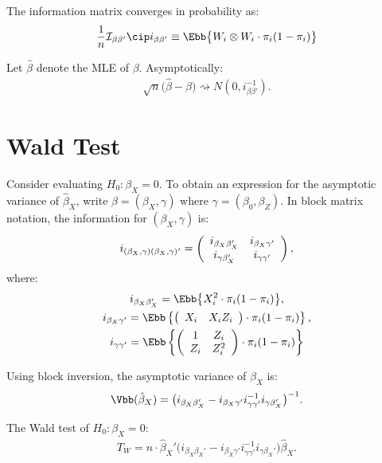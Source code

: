 The information matrix converges in probability as:
\begin{align*}
\frac{1}{n} \mathcal{I}_{\beta\beta'} \cip i_{\beta\beta'} \equiv \Ebb\big\{W_{i} \otimes W_{i} \cdot \pi_{i}(1 - \pi_{i})\big\}
\end{align*}

Let $\hat{\beta}$ denote the MLE of $\beta$. Asymptotically:
\begin{align*}
\sqrt{n}\big(\hat{\beta} - \beta \big) \rightsquigarrow N(0, i_{\beta\beta'}^{-1}). 
\end{align*}

\section{Wald Test}

Consider evaluating $H_{0}: \beta_{X} = 0$. To obtain an expression for the asymptotic variance of $\hat{\beta}_{X}$, write $\beta = (\beta_{X}, \gamma)$ where $\gamma = (\beta_{0}, \beta_{Z})$. In block matrix notation, the information for $(\beta_{X}, \gamma)$ is:
\begin{align*}
i_{(\beta_{X}, \gamma)(\beta_{X}, \gamma)'} = \left(
\begin{array}{c c}
i_{\beta_{X}\beta_{X}'} & i_{\beta_{X}\gamma'} \\
i_{\gamma\beta_{X}'} & i_{\gamma\gamma'}
\end{array}
\right),
\end{align*}
where:
\begin{gather*}
i_{\beta_{X}\beta_{X}'} = \Ebb\big\{X_{i}^{2} \cdot \pi_{i} (1 - \pi_{i}) \big\}, \\
i_{\beta_{X}\gamma'} = \Ebb\left\{
\big(
\begin{array}{c c}
X_{i} & X_{i}Z_{i}
\end{array} \big)
\cdot \pi_{i}(1 - \pi_{i}) \right\}, \\
i_{\gamma\gamma'} = \Ebb\left\{
\left(
\begin{array}{c c}
1 & Z_{i} \\
Z_{i} & Z_{i}^{2}
\end{array}
\right) \cdot \pi_{i} (1 - \pi_{i})
\right\}
\end{gather*}

Using block inversion, the asymptotic variance of $\beta_{X}$ is:
\begin{align*}
\Vbb(\hat{\beta}_{X}) = \big(i_{\beta_{X}\beta_{X}'} - i_{\beta_{X}\gamma'} i_{\gamma\gamma'}^{-1}i_{\gamma\beta_{X}'}\big)^{-1}.
\end{align*}

The Wald test of $H_{0}: \beta_{X} = 0$:
\begin{align*}
T_{W} = n \cdot \hat{\beta}_{X}'(i_{\beta_{X}\beta_{X}'} - i_{\beta_{X}\gamma'} i_{\gamma\gamma'}^{-1}i_{\gamma\beta_{X}'}\big)\hat{\beta}_{X}.
\end{align*}



